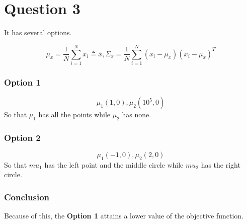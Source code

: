 \documentclass[12pt, letterpaper]{article}
\begin{document}
\section*{Question 3}

It has several options.

\begin{equation}
	\mu_x=\frac1N\sum^N_{i=1}x_i\triangleq\bar{x},\Sigma_x=\frac1N\sum^N_{i=1}(x_i-\mu_x)(x_i-\mu_x)^T
\end{equation}

\subsubsection*{Option 1}
\begin{equation}
	\mu_1(1,0),\mu_2(10^5,0)
\end{equation}
So that $\mu_1$ has all the points while $\mu_2$ has none.

\subsubsection*{Option 2}
\begin{equation}
	\mu_1(-1,0),\mu_2(2,0)
\end{equation}
So that $mu_1$ has the left point and the middle circle while $mu_2$ has the right circle.

\subsubsection*{Conclusion}
Because of this, the \textbf{Option 1} attains a lower value of the objective function.
\end{document}
